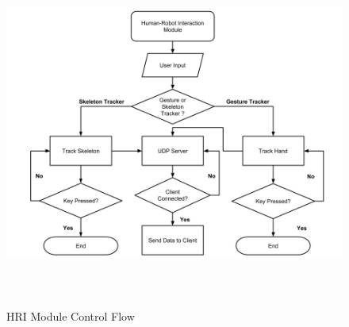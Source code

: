 \begin{figure}
	[h] \centering 
	\includegraphics[height=115mm]{figures/content/hri-flow.jpg} \caption{HRI Module Control Flow} \label{fg:hri:flow} 
\end{figure}
